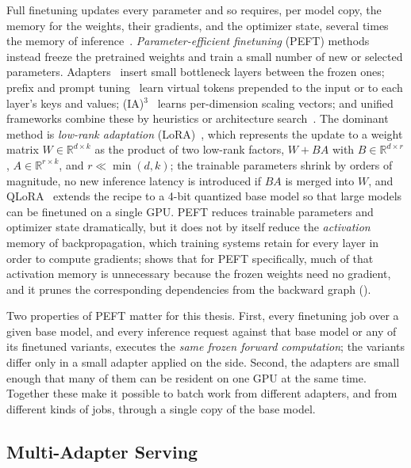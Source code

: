 Full finetuning updates every parameter and so requires, per model copy, the memory for the weights, their gradients, and the optimizer state, several times the memory of inference~\cite{kingma2014adam}.
\emph{Parameter-efficient finetuning} (PEFT) methods~\cite{ding2023parameter} instead freeze the pretrained weights and train a small number of new or selected parameters.
Adapters~\cite{houlsby2019parameter,pfeiffer2020adapterfusion} insert small bottleneck layers between the frozen ones; prefix and prompt tuning~\cite{li2021prefix,lester2021power,liu2023gpt} learn virtual tokens prepended to the input or to each layer's keys and values; (IA)$^3$~\cite{liu2022few} learns per-dimension scaling vectors; and unified frameworks combine these by heuristics or architecture search~\cite{he2021towards,mao2021unipelt,zhou2023autopeft}.
The dominant method is \emph{low-rank adaptation} (LoRA)~\cite{hu2021lora}, which represents the update to a weight matrix $W \in \mathbb{R}^{d \times k}$ as the product of two low-rank factors, $W + BA$ with $B \in \mathbb{R}^{d \times r}$, $A \in \mathbb{R}^{r \times k}$, and $r \ll \min(d, k)$; the trainable parameters shrink by orders of magnitude, no new inference latency is introduced if $BA$ is merged into $W$, and QLoRA~\cite{dettmers2023qlora} extends the recipe to a 4-bit quantized base model so that large models can be finetuned on a single GPU.
PEFT reduces trainable parameters and optimizer state dramatically, but it does not by itself reduce the \emph{activation} memory of backpropagation, which training systems retain for every layer in order to compute gradients; \FlexLLM shows that for PEFT specifically, much of that activation memory is unnecessary because the frozen weights need no gradient, and it prunes the corresponding dependencies from the backward graph ().

Two properties of PEFT matter for this thesis.
First, every finetuning job over a given base model, and every inference request against that base model or any of its finetuned variants, executes the \emph{same frozen forward computation}; the variants differ only in a small adapter applied on the side.
Second, the adapters are small enough that many of them can be resident on one GPU at the same time.
Together these make it possible to batch work from different adapters, and from different kinds of jobs, through a single copy of the base model.

\subsection{Multi-Adapter Serving}
\label{background:subsec:multi_adapter}

